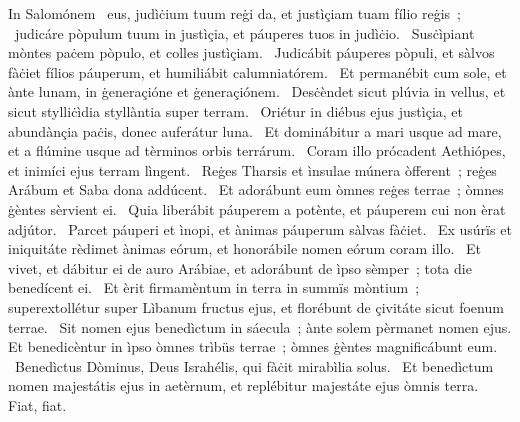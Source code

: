 { In Salomónem}
{%
~eus, judìċium tuum reġi da, et justìçiam tuam fílio reġis~; 
~judicáre pòpulum tuum in justìçia, et páuperes tuos in judìċio. 
~Susċìpiant mòntes paċem pòpulo, et colles justìçiam. 
~Judicábit páuperes pòpuli, et sàlvos fàċiet fílios páuperum, et humiliábit calumniatórem. 
~Et permanébit cum sole, et ànte lunam, in ġeneraçióne et ġeneraçiónem. 
~Desċèndet sicut plúvia in vellus, et sicut stylliċìdia styllàntia super terram. 
~Oriétur in diébus ejus justìçia, et abundànçia paċis, donec auferátur luna. 
~Et dominábitur a mari usque ad mare, et a flúmine usque ad tèrminos orbis terrárum. 
~Coram illo prócadent Aethiópes, et inimíci ejus terram lìngent. 
~Reġes Tharsis et ìnsulae múnera òfferent~; reġes Arábum et Saba dona addúcent. 
~Et adorábunt eum òmnes reġes terrae~; òmnes ġèntes sèrvient ei. 
~Quia liberábit páuperem a potènte, et páuperem cui non èrat adjútor. 
~Parcet páuperi et ìnopi, et ànimas páuperum sàlvas fàċiet. 
~Ex usúrïs et iniquitáte rèdimet ànimas eórum, et honorábile nomen eórum coram illo. 
~Et vivet, et dábitur ei de auro Arábiae, et adorábunt de ìpso sèmper~; tota die benedícent ei. 
~Et èrit firmamèntum in terra in summïs mòntium~; superextollétur super Lìbanum fructus ejus, et florébunt de çivitáte sicut foenum terrae. 
~Sit nomen ejus benedìctum in sáecula~; ànte solem pèrmanet nomen ejus. Et benedicèntur in ìpso òmnes trìbüs terrae~; òmnes ġèntes magnificábunt eum. 
~Benedìctus Dòminus, Deus Israhélis, qui fàċit mirabìlia solus. 
~Et benedìctum nomen majestátis ejus in aetèrnum, et replébitur majestáte ejus òmnis terra. Fiat, fiat. 
}
